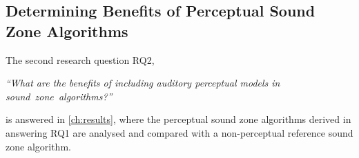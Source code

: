 \subsection{Determining Benefits of Perceptual Sound Zone Algorithms}
The second research question RQ2, 

\begin{center}
    {\textit{``What are the benefits of including auditory perceptual models in sound~zone~algorithms?''}}
\end{center}

is answered in \autoref{ch:results}, where the perceptual sound zone algorithms derived in answering RQ1 are 
analysed and compared with a non-perceptual reference sound zone algorithm.
